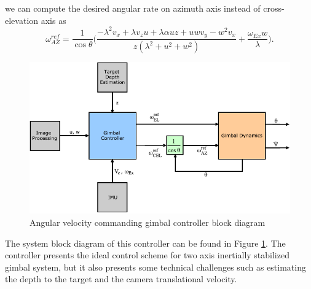 we can compute the desired angular rate on azimuth axis instead of cross-elevation axis as
\begin{equation}
\omega_{AZ}^{ref}=\frac{1}{\cos \theta}\bigg(\frac{-\lambda^2 v_x+\lambda v_z u+\lambda \alpha uz +uwv_y -w^2 v_x}{z(\lambda^2+u^2+w^2)}+\frac{\omega_{Ex}w}{\lambda}\bigg).
\end{equation}
\begin{figure}[t]
	\centering
	\includegraphics[width = 5in]{images/chapter2/gp_blockdiagram.pdf}
	\caption{Angular velocity commanding gimbal controller block diagram}
	\label{avcg_blockdiagram}
\end{figure}
The system block diagram of this controller can be found in Figure \ref{avcg_blockdiagram}. The controller presents the ideal control scheme for two axis inertially stabilized gimbal system, but it also presents some technical challenges such as estimating the depth to the target and the camera translational velocity. 